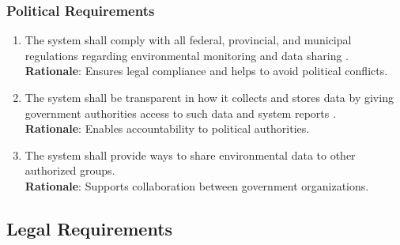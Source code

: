 \documentclass[]{article}
\begin{document}
\subsubsection{Political Requirements}
\label{ssub:political_requirements}
\begin{enumerate}[{CP-P}1. ]
	\item The system shall comply with all federal, provincial, and municipal regulations regarding environmental monitoring and data sharing \cite{canEnv}. \\
    \textbf{Rationale}: Ensures legal compliance and helps to avoid political conflicts.
    	
    \item The system shall be transparent in how it collects and stores data by giving government authorities access to such data and system reports \cite{canDirective}. \\
    \textbf{Rationale}: Enables accountability to political authorities. 
        	
    \item The system shall provide ways to share environmental data to other authorized groups. \\
    \textbf{Rationale}: Supports collaboration between government organizations.
\end{enumerate}

\subsection{Legal Requirements}
\label{sub:legal_requirements}
\end{document}
